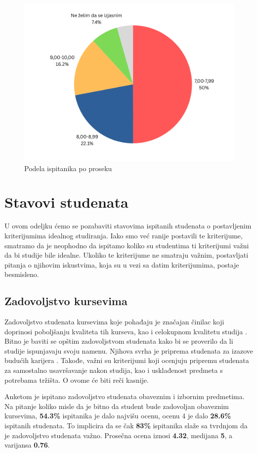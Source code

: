 \documentclass[a4paper]{article}
\begin{document}
{\begin{figure}[H]
    \centering
    \includegraphics[width=0.7\linewidth]{prosek.png}
    \caption{Podela ispitanika po proseku}
    \label{fig:raspodela_prosek}
\end{figure}

\section{Stavovi studenata}
\label{sec:stavovi}


U ovom odeljku ćemo se pozabaviti stavovima ispitanih studenata o postavljenim kriterijumima idealnog studiranja. Iako smo već ranije postavili te kriterijume, smatramo da je neophodno da ispitamo koliko su studentima ti kriterijumi važni da bi studije bile idealne. Ukoliko te kriterijume ne smatraju važnim, postavljati pitanja o njihovim iskustvima, koja su u vezi sa datim kriterijumima, postaje besmisleno.


\subsection{Zadovoljstvo kursevima}
\label{subsec:zadovoljstvo_stavovi}

Zadovoljstvo studenata kursevima koje pohađaju je značajan činilac koji doprinosi poboljšanju kvaliteta tih kurseva, kao i celokupnom kvalitetu studija \cite{satisfaction}. Bitno je baviti se opštim zadovoljstvom studenata kako bi se proverilo da li studije ispunjavaju svoju namenu. Njihova svrha je priprema studenata za izazove budućih karijera \cite{education}. Takođe, važni su kriterijumi koji ocenjuju pripremu studenata za samostalno usavršavanje nakon studija, kao i usklađenost predmeta s potrebama tržišta. O ovome će biti reči kasnije.

Anketom je ispitano zadovoljstvo studenata obaveznim i izbornim predmetima. Na pitanje koliko misle da je bitno da student bude zadovoljan obaveznim kursevima, \textbf{54.3\%} ispitanika je dalo najvišu ocenu, ocenu 4 je dalo \textbf{28.6\%} ispitanih studenata. To implicira da se čak \textbf{83\%} ispitanika slaže sa tvrdnjom da je zadovoljstvo studenata važno. Prosečna ocena iznosi \textbf{4.32}, medijana \textbf{5}, a varijansa \textbf{0.76}.

}
\end{document}
